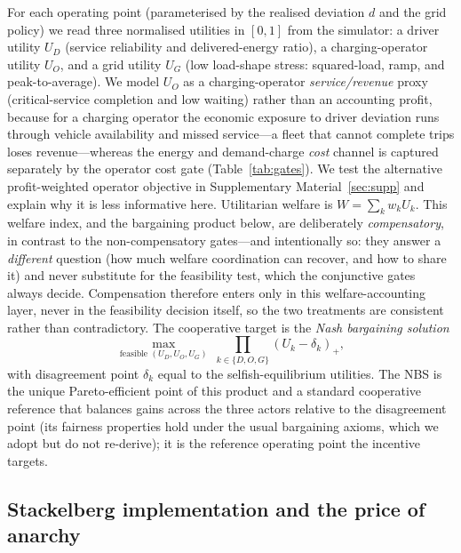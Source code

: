 \documentclass[12pt]{article}
\begin{document}
For each operating point (parameterised by the realised deviation $d$ and the grid
policy) we read three normalised utilities in $[0,1]$ from the simulator: a driver
utility $U_D$ (service reliability and delivered-energy ratio), a charging-operator utility $U_O$,
and a grid utility $U_G$ (low load-shape stress: squared-load, ramp, and peak-to-average).
We model $U_O$ as a charging-operator \emph{service/revenue} proxy (critical-service completion and
low waiting) rather than an accounting profit, because for a charging operator the economic
exposure to driver deviation runs through vehicle availability and missed service---a
fleet that cannot complete trips loses revenue---whereas the energy and demand-charge
\emph{cost} channel is captured separately by the operator cost gate (Table~\ref{tab:gates}).
We test the alternative profit-weighted operator objective in Supplementary Material~\ref{sec:supp} and explain why it is less
informative here. Utilitarian welfare is $W=\sum_{k}w_k U_k$. This welfare index, and the bargaining product below, are deliberately \emph{compensatory}, in contrast to the non-compensatory gates---and intentionally so: they answer a \emph{different} question (how much welfare coordination can recover, and how to share it) and never substitute for the feasibility test, which the conjunctive gates always decide. Compensation therefore enters only in this welfare-accounting layer, never in the feasibility decision itself, so the two treatments are consistent rather than contradictory. The cooperative target is the \emph{Nash bargaining solution}
\begin{equation}
\max_{\text{feasible }(U_D,U_O,U_G)} \;\prod_{k\in\{D,O,G\}} (U_k-\delta_k)_+,
\label{eq:nbs}
\end{equation}
with disagreement point $\delta_k$ equal to the selfish-equilibrium utilities. The NBS is the
unique Pareto-efficient point of this product and a standard cooperative reference that
balances gains across the three actors relative to the disagreement point (its fairness
properties hold under the usual bargaining axioms, which we adopt but do not re-derive);
it is the reference operating point the incentive targets.

\subsection{Stackelberg implementation and the price of anarchy}
\end{document}
